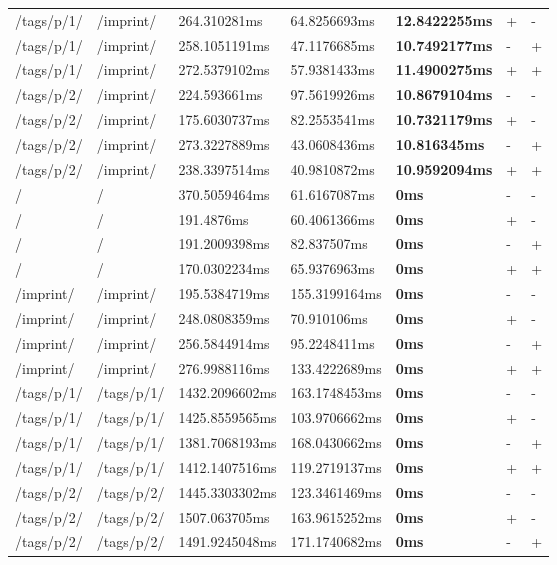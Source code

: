 \begin{appendix}
\begin{center}
\begin{longtable}{lllllll}
	/tags/p/1/ & /imprint/ & 264.310281ms & 64.8256693ms & \textbf{12.8422255ms} & + & - \\
	/tags/p/1/ & /imprint/ & 258.1051191ms & 47.1176685ms & \textbf{10.7492177ms} & - & + \\
	/tags/p/1/ & /imprint/ & 272.5379102ms & 57.9381433ms & \textbf{11.4900275ms} & + & + \\
	\hline
	/tags/p/2/ & /imprint/ & 224.593661ms & 97.5619926ms & \textbf{10.8679104ms} & - & - \\
	/tags/p/2/ & /imprint/ & 175.6030737ms & 82.2553541ms & \textbf{10.7321179ms} & + & - \\
	/tags/p/2/ & /imprint/ & 273.3227889ms & 43.0608436ms & \textbf{10.816345ms} & - & + \\
	/tags/p/2/ & /imprint/ & 238.3397514ms & 40.9810872ms & \textbf{10.9592094ms} & + & + \\
	\hline
	\hline
	/ & / & 370.5059464ms & 61.6167087ms & \textbf{0ms} & - & - \\
	/ & / & 191.4876ms & 60.4061366ms & \textbf{0ms} & + & - \\
	/ & / & 191.2009398ms & 82.837507ms & \textbf{0ms} & - & + \\
	/ & / & 170.0302234ms & 65.9376963ms & \textbf{0ms} & + & + \\
	\hline
	/imprint/ & /imprint/ & 195.5384719ms & 155.3199164ms & \textbf{0ms} & - & - \\
	/imprint/ & /imprint/ & 248.0808359ms & 70.910106ms & \textbf{0ms} & + & - \\
	/imprint/ & /imprint/ & 256.5844914ms & 95.2248411ms & \textbf{0ms} & - & + \\
	/imprint/ & /imprint/ & 276.9988116ms & 133.4222689ms & \textbf{0ms} & + & + \\
	\hline
	/tags/p/1/ & /tags/p/1/ & 1432.2096602ms & 163.1748453ms & \textbf{0ms} & - & - \\
	/tags/p/1/ & /tags/p/1/ & 1425.8559565ms & 103.9706662ms & \textbf{0ms} & + & - \\
	/tags/p/1/ & /tags/p/1/ & 1381.7068193ms & 168.0430662ms & \textbf{0ms} & - & + \\
	/tags/p/1/ & /tags/p/1/ & 1412.1407516ms & 119.2719137ms & \textbf{0ms} & + & + \\
	\hline
	/tags/p/2/ & /tags/p/2/ & 1445.3303302ms & 123.3461469ms & \textbf{0ms} & - & - \\
	/tags/p/2/ & /tags/p/2/ & 1507.063705ms & 163.9615252ms & \textbf{0ms} & + & - \\
	/tags/p/2/ & /tags/p/2/ & 1491.9245048ms & 171.1740682ms & \textbf{0ms} & - & + \\

\end{longtable}
\end{center}
\end{appendix}
